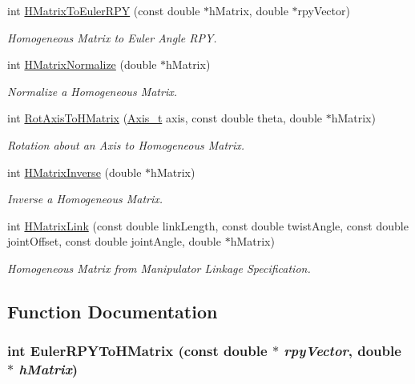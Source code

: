 \begin{CompactItemize}
int \hyperlink{group__homogeneous_g1331c182a0156371f53bbe26f721c8fa}{HMatrixToEulerRPY} (const double $\ast$hMatrix, double $\ast$rpyVector)
\begin{CompactList}\small\item\em Homogeneous Matrix to Euler Angle RPY. \item\end{CompactList}\item 
int \hyperlink{group__homogeneous_gfc783d7c3cacff9513b7e461b243ee07}{HMatrixNormalize} (double $\ast$hMatrix)
\begin{CompactList}\small\item\em Normalize a Homogeneous Matrix. \item\end{CompactList}\item 
int \hyperlink{group__homogeneous_ge9f5bb16caafcd7644d14eb29c175833}{RotAxisToHMatrix} (\hyperlink{libdrdc_8h_32b2eaf8bafc891ec8018cbe48d39243}{Axis\_\-t} axis, const double theta, double $\ast$hMatrix)
\begin{CompactList}\small\item\em Rotation about an Axis to Homogeneous Matrix. \item\end{CompactList}\item 
int \hyperlink{group__homogeneous_g7e37012b55e5a56c288513e3bace06f7}{HMatrixInverse} (double $\ast$hMatrix)
\begin{CompactList}\small\item\em Inverse a Homogeneous Matrix. \item\end{CompactList}\item 
int \hyperlink{group__homogeneous_g0c48c0e48e92cd283e7b110ac6a5704b}{HMatrixLink} (const double linkLength, const double twistAngle, const double jointOffset, const double jointAngle, double $\ast$hMatrix)
\begin{CompactList}\small\item\em Homogeneous Matrix from Manipulator Linkage Specification. \item\end{CompactList}\end{CompactItemize}


\subsection{Function Documentation}
\hypertarget{group__homogeneous_g0be4d04db6aa88d63dd839ba12b4ecb7}{
\subsubsection[EulerRPYToHMatrix]{\setlength{\rightskip}{0pt plus 5cm}int EulerRPYToHMatrix (const double $\ast$ {\em rpyVector}, \/  double $\ast$ {\em hMatrix})}}
\label{group__homogeneous_g0be4d04db6aa88d63dd839ba12b4ecb7}


